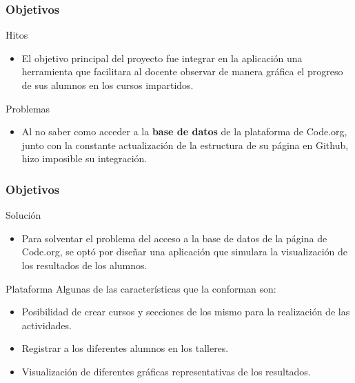 \documentclass{beamer}
\begin{document}
\begin{frame}

\frametitle{Objetivos }

\begin{block}{Hitos}
  \begin{itemize}
  \item
   El objetivo principal del proyecto fue integrar en la aplicación una herramienta que facilitara al docente observar de manera gráfica el progreso de sus alumnos
   en los cursos impartidos.

  \end{itemize}
\end{block}

\begin{alertblock}{Problemas}
    \begin{itemize}
        \item Al no saber como acceder a la \textbf{base de datos} de la plataforma de Code.org, junto con la constante actualización de la estructura de su página en Github, hizo imposible su integración.
    \end{itemize}
\end{alertblock}

\end{frame}
\begin{frame}

\frametitle{Objetivos }

\begin{exampleblock}{Solución}
    \begin{itemize}
        \item Para solventar el problema del acceso a la base de datos de la página de Code.org, se optó por diseñar una aplicación que simulara la visualización de los resultados
        de los alumnos.
    \end{itemize}
\end{exampleblock}

\begin{block}{Plataforma}
    Algunas de las características que la conforman son:
    \begin{itemize}
        \item Posibilidad de crear cursos y secciones de los mismo para la realización de las actividades.
        \item Registrar a los diferentes alumnos en los talleres.
        \item Visualización de diferentes gráficas representativas de los resultados.
    \end{itemize}
\end{block}

\end{frame}
\end{document}
